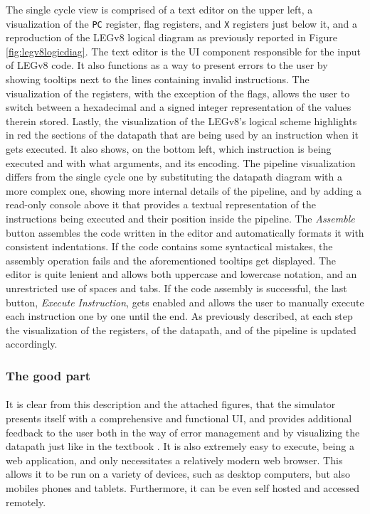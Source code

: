 The single cycle view is comprised of a text editor on the upper left, a visualization of the \verb|PC| register, flag registers, and \verb|X| registers just below it, and a reproduction of the LEGv8 logical diagram as previously reported in Figure \ref{fig:legv8logicdiag}. The text editor is the UI component responsible for the input of LEGv8 code. It also functions as a way to present errors to the user by showing tooltips next to the lines containing invalid instructions. The visualization of the registers, with the exception of the flags, allows the user to switch between a hexadecimal and a signed integer representation of the values therein stored. Lastly, the visualization of the LEGv8's logical scheme highlights in red the sections of the datapath that are being used by an instruction when it gets executed. It also shows, on the bottom left, which instruction is being executed and with what arguments, and its encoding.
The pipeline visualization differs from the single cycle one by substituting the datapath diagram with a more complex one, showing more internal details of the pipeline, and by adding a read-only console above it that provides a textual representation of the instructions being executed and their position inside the pipeline.
The \emph{Assemble} button assembles the code written in the editor and automatically formats it with consistent indentations. If the code contains some syntactical mistakes, the assembly operation fails and the aforementioned tooltips get displayed. The editor is quite lenient and allows both uppercase and lowercase notation, and an unrestricted use of spaces and tabs.
If the code assembly is successful, the last button, \emph{Execute Instruction}, gets enabled and allows the user to manually execute each instruction one by one until the end. As previously described, at each step the visualization of the registers, of the datapath, and of the pipeline is updated accordingly.
\subsubsection{The good part}
\paragraph{}
It is clear from this description and the attached figures, that the simulator presents itself with a comprehensive and functional UI, and provides additional feedback to the user both in the way of error management and by visualizing the datapath just like in the textbook \cite{patterson2016computer}. It is also extremely easy to execute, being a web application, and only necessitates a relatively modern web browser. This allows it to be run on a variety of devices, such as desktop computers, but also mobiles phones and tablets. Furthermore, it can be even self hosted and accessed remotely.

